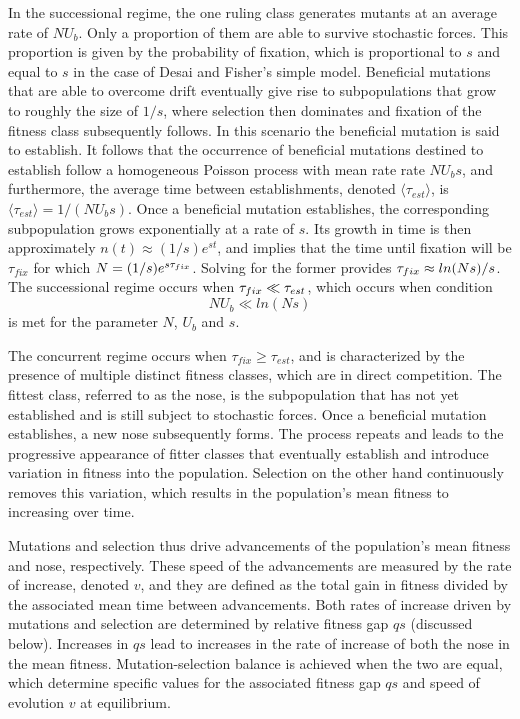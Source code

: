 \documentclass[12pt]{article}
\begin{document}
In the successional regime, the one ruling class generates mutants at an average rate of $N U_b$.  Only a proportion of them are able to survive stochastic forces.  This proportion is given by the probability of fixation, which is proportional to $s$ and equal to $s$ in the case of Desai and Fisher's simple model.  Beneficial mutations that are able to overcome drift eventually give rise to subpopulations that grow to roughly the size of $1/s$, where selection then dominates and fixation of the fitness class subsequently follows.  In this scenario the beneficial mutation is said to establish.  It follows that the occurrence of beneficial mutations destined to establish follow a homogeneous Poisson process with mean rate rate $NU_b s$, and furthermore, the average time between establishments, denoted $\langle \tau_{est} \rangle$, is $\langle \tau_{est} \rangle = 1/(N U_b s)$.  Once a beneficial mutation establishes, the corresponding subpopulation grows exponentially at a rate of $s$.  Its growth in time is then approximately $n(t)\approx (1/s) e^{st}$, and implies that the time until fixation will be $\tau_{fix}$ for which $N =(1/s)e^{s \tau_{\footnotesize fix}}$.  Solving for the former provides $\tau_{\footnotesize fix} \approx ln(Ns)/s$.  The successional regime occurs when $\tau_{\footnotesize fix} \ll \tau_{\footnotesize est}$, which occurs when condition
\[ N U_b \ll ln(Ns) \] 
is met for the parameter $N$, $U_b$ and $s$. 

The concurrent regime occurs when $\tau_{fix} \ge \tau_{est}$, and is characterized by the presence of multiple distinct fitness classes, which are in direct competition.  The fittest class, referred to as the nose, is the subpopulation that has not yet established and is still subject to stochastic forces.  Once a beneficial mutation establishes, a new nose subsequently forms.  The process repeats and leads to the progressive appearance of fitter classes that eventually establish and introduce variation in fitness into the population.  Selection on the other hand continuously removes this variation, which results in the population's mean fitness to increasing over time.  

Mutations and selection thus drive advancements of the population's mean fitness and nose, respectively.  These speed of the advancements are measured by the rate of increase, denoted $v$, and they are defined as the total gain in fitness divided by the associated mean time between advancements.  Both rates of increase driven by mutations and selection are determined by relative fitness gap $qs$ (discussed below).  Increases in $qs$ lead to increases in the rate of increase of both the nose in the mean fitness.  Mutation-selection balance is achieved when the two are equal, which determine specific values for the associated fitness gap $qs$ and speed of evolution $v$ at equilibrium. 
\end{document}
